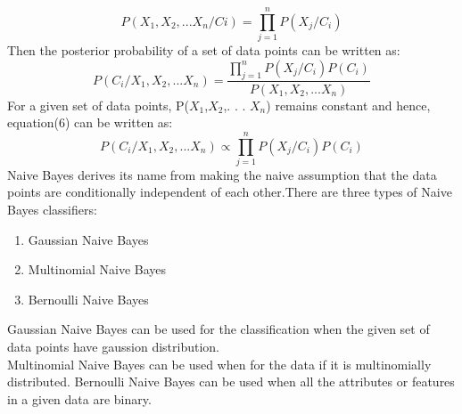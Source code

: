\documentclass[sigconf]{acmart}
\begin{document}
\begin{equation}
    P(X_1,X_2,. . . X_n/Ci) = \prod_{j=1}^{n} P(X_j/C_i)
\end{equation}
Then the posterior probability of a set of data points can be written as:
\begin{equation}
    P(C_i/X_1,X_2,. . . X_n) = \frac{\prod_{j=1}^{n} P(X_j/C_i) P(C_i)}{P(X_1,X_2,. . . X_n) }	
\end{equation}
For a given set of data points, P($X_1$,$X_2$,. . . $X_n$) remains constant and hence, equation(6) can be written as:
\begin{equation}
    P(C_i/X_1,X_2,. . . X_n) \propto \prod_{j=1}^{n} P(X_j/C_i) P(C_i)
\end{equation}
Naive Bayes derives its name from making the naive assumption that the data points are conditionally independent of each other.There are three types of Naive Bayes classifiers:
\begin{enumerate}
    \item Gaussian Naive Bayes
    \item Multinomial Naive Bayes
    \item Bernoulli Naive Bayes
\end{enumerate}
Gaussian Naive Bayes can be used for the classification when the given set of data points have gaussion distribution.\\
Multinomial Naive Bayes can be used when for the data if it is multinomially distributed.
Bernoulli Naive Bayes can be used when all the attributes or features in a given data are binary.
\end{document}
